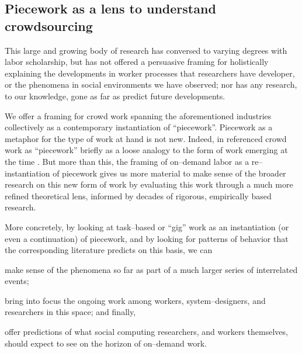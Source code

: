 \documentclass[trackingWork]{subfiles}
\begin{document}
\subsection{Piecework as a lens to understand crowdsourcing}
This large and growing body of research has conversed
to varying degrees with labor scholarship,
but has not offered a persuasive framing for holistically explaining
the developments in worker processes that researchers have developer, or
the phenomena in social environments we have observed;
nor has any research, to our knowledge,
gone as far as predict future developments.

We offer a framing for crowd work spanning the aforementioned industries
collectively as a contemporary instantiation of  ``piecework''.
Piecework as a metaphor for the type of work at hand is not new.
Indeed,
\citeauthor{crowdworkFuture} in \citeyear{crowdworkFuture}
referenced crowd work as ``piecework'' briefly
as a loose analogy to the form of work emerging at the time
\cite{crowdworkFuture}.
But more than this,
the framing of on--demand labor as a re--instantiation of piecework
gives us more material to make sense of the broader research on this new form of work
by evaluating this work through a much more refined theoretical lens,
informed by decades of rigorous, empirically based research.

More concretely, by looking at task--based or ``gig'' work  as
an instantiation (or even a continuation) of piecework,
and by looking for patterns of behavior that the corresponding literature predicts
on this basis, we can
\begin{inlinelist}
  \item make sense of the phenomena so far as part of a much larger series of interrelated events;
  \item bring into focus the ongoing work among
        workers,
        system--designers, and
        researchers in this space;
        and finally,
  \item offer predictions of what social computing  researchers,
        and workers themselves,
        should expect to see on the horizon of on--demand work.
\end{inlinelist}
\end{document}
